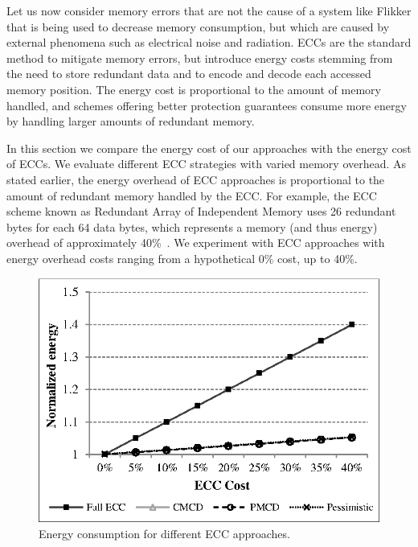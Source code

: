 \documentclass{article}
\begin{document}
Let us now consider memory errors that are not the cause of a system like Flikker that is being used to decrease memory consumption, but which are caused by external phenomena such as electrical noise and radiation.
ECCs are the standard method to mitigate memory errors, but introduce energy costs stemming from the need to store redundant data and to encode and decode each accessed memory position. The energy cost is proportional to the amount of memory handled, and schemes offering better protection guarantees consume more energy by handling larger amounts of redundant memory. 



In this section we compare the energy cost of our approaches with the energy cost of ECCs. We evaluate different ECC strategies with varied memory overhead. As stated earlier, the energy overhead of ECC approaches is proportional to the amount of redundant memory handled by the ECC. For example, the ECC scheme known as Redundant Array of Independent Memory uses 26 redundant bytes for each 64 data bytes, which represents a memory (and thus energy) overhead of approximately 40\%~\cite{6136239}. We experiment with ECC approaches with energy overhead costs ranging from a hypothetical 0\% cost, up to 40\%. %

\begin{figure}[!t]
\centering
\includegraphics[scale=.8]{figures/ecc_chart.eps}
\caption{Energy consumption for different ECC approaches.}
\label{fig:ecc}
\end{figure}
\end{document}
